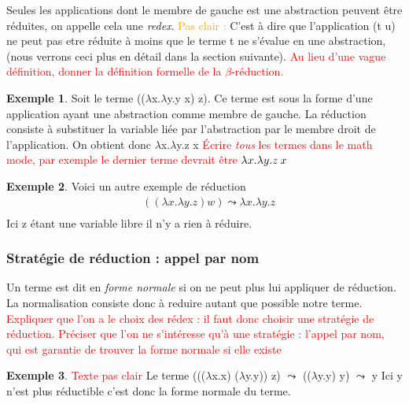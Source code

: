 \documentclass {article}
\theoremstyle{definition}
\newtheorem{example}{Exemple}
\theoremstyle{remark}
\newcommand{\todo}[1]{\textcolor{red}{#1}}
\newcommand{\attention}[1]{\textcolor{orange}{#1}}
\begin{document}
Seules les applications dont le membre de gauche est une abstraction
peuvent être réduites, on appelle cela une \emph{redex}.
\attention{Pas clair :} C'est à dire que l'application (t u) ne peut
pas etre réduite à moins que le terme t ne s'évalue en une
abstraction, (nous verrons ceci plus en détail dans la section
suivante). \todo{Au lieu d'une vague définition, donner la définition
  formelle de la $\beta$-réduction.}

\begin{example}
  Soit le terme ((\(\lambda\)x.\(\lambda\)y.y x) z).  Ce terme est
  sous la forme d'une application ayant une abstraction comme membre
  de gauche. La réduction consiste à substituer la variable liée par
  l'abstraction par le membre droit de l'application. On obtient donc \(\lambda\)x.\(\lambda\)y.z x
  \todo{Écrire \emph{tous} les termes dans le math mode, par exemple le dernier terme devrait être \(\lambda x. \lambda y. z\:x\)}
\end{example}

\begin{example}
  Voici un autre exemple de réduction
  \begin{align*}
    & ((\lambda x .\lambda y. z) w) \leadsto \lambda x.\lambda y.z \\
  \end{align*}
  Ici z étant une variable libre il n'y a rien à réduire.
\end{example}


\subsubsection{Stratégie de réduction : appel par nom}

Un terme est dit en \emph{forme normale} si on ne peut plus lui
appliquer de réduction. La normalisation consiste donc à reduire
autant que possible notre terme. \todo{Expliquer que l'on a le choix
  des rédex : il faut donc choisir une stratégie de
  réduction. Préciser que l'on ne s'intéresse qu'à une stratégie :
  l'appel par nom, qui est garantie de trouver la forme normale si
  elle existe}

\begin{example}
  \todo{Texte pas clair}
  Le terme (((\(\lambda\)x.x) (\(\lambda\)y.y)) z) \(\leadsto\) ((\(\lambda\)y.y) y) 
\(\leadsto\) y %
  Ici y n'est plus réductible c'est donc la forme normale du terme.
\end{example}
\end{document}
